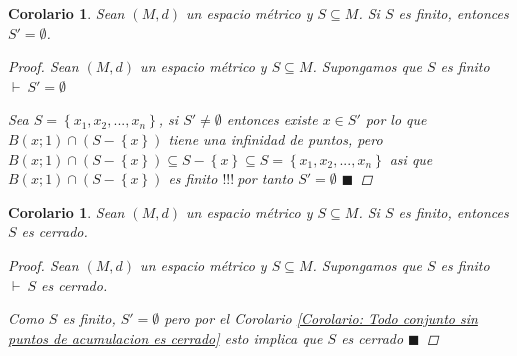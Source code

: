 \documentclass[oneside]{book} %
\theoremstyle{Teorema}
\newtheorem{Corolario}[Definicion]{Corolario}
\theoremstyle{Ejemplos}
\theoremstyle{[Obs]}
\renewcommand{\{}{\left\lbrace} %
\renewcommand{\}}{\right\rbrace} %
\newcommand{\n}{\cap} %
\renewcommand{\sc}{\subseteq} %
\renewcommand{\qed}{$\blacksquare$} %
\newcommand{\pd}{$\vdash\ $} %
\renewcommand{\c}{$!!!\ $} %
\begin{document}
			\begin{Corolario}\setlength{\parindent}{0em}
			
				Sean $(M, d)$ un espacio métrico y $S \sc M$. Si $S$ es finito, entonces $S' = \emptyset$. 

				\begin{proof}
					
					Sean $(M, d)$ un espacio métrico y $S \sc M$. Supongamos que $S$ es finito \\ 
					\pd $S' = \emptyset$

					Sea $S = \{ x_1, x_2, ..., x_n \}$, si $S' \neq \emptyset$ entonces existe $x \in S'$ por lo que $B(x;1) \n (S - \{ x \})$ tiene una infinidad de puntos, pero $B(x;1) \n (S - \{ x \}) \sc S - \{ x \} \sc S = \{ x_1, x_2, ..., x_n \}$ asi que $B(x;1) \n (S - \{ x \})$ es finito \c por tanto $S' = \emptyset$ \qed

				\end{proof}
			
			\end{Corolario}

			\begin{Corolario}\setlength{\parindent}{0em}
			
				Sean $(M, d)$ un espacio métrico y $S \sc M$. Si $S$ es finito, entonces $S$ es cerrado. 

				\begin{proof}
					
					Sean $(M, d)$ un espacio métrico y $S \sc M$. Supongamos que $S$ es finito \\ 
					\pd $S$ es cerrado. 

					Como $S$ es finito, $S' = \emptyset$ pero por el Corolario \ref{Corolario: Todo conjunto sin puntos de acumulacion es cerrado} esto implica que $S$ es cerrado \qed

				\end{proof}
			
			\end{Corolario}
\end{document}
